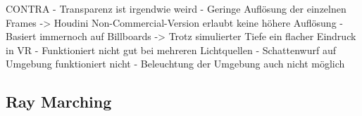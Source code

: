 CONTRA\newline
- Transparenz ist irgendwie weird\newline
- Geringe Auflösung der einzelnen Frames \newline
 -> Houdini Non-Commercial-Version erlaubt keine höhere Auflösung\newline
- Basiert immernoch auf Billboards\newline
 -> Trotz simulierter Tiefe ein flacher Eindruck in VR\newline
- Funktioniert nicht gut bei mehreren Lichtquellen
- Schattenwurf auf Umgebung funktioniert nicht
- Beleuchtung der  Umgebung auch nicht möglich




\subsection{Ray Marching}
\label{sec:5.2}